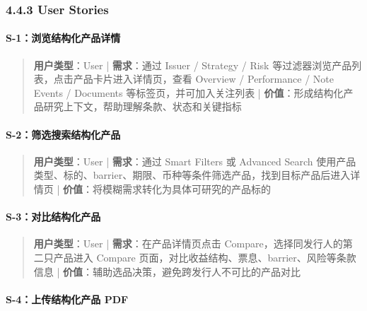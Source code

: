 \subsubsection{4.4.3 User Stories}

\paragraph{S-1：浏览结构化产品详情}

\begin{quote}\small \textbf{用户类型}：User | \textbf{需求}：通过 Issuer / Strategy / Risk 等过滤器浏览产品列表，点击产品卡片进入详情页，查看 Overview / Performance / Note Events / Documents 等标签页，并可加入关注列表 | \textbf{价值}：形成结构化产品研究上下文，帮助理解条款、状态和关键指标\end{quote}


\paragraph{S-2：筛选搜索结构化产品}

\begin{quote}\small \textbf{用户类型}：User | \textbf{需求}：通过 Smart Filters 或 Advanced Search 使用产品类型、标的、barrier、期限、币种等条件筛选产品，找到目标产品后进入详情页 | \textbf{价值}：将模糊需求转化为具体可研究的产品标的\end{quote}


\paragraph{S-3：对比结构化产品}

\begin{quote}\small \textbf{用户类型}：User | \textbf{需求}：在产品详情页点击 Compare，选择同发行人的第二只产品进入 Compare 页面，对比收益结构、票息、barrier、风险等条款信息 | \textbf{价值}：辅助选品决策，避免跨发行人不可比的产品对比\end{quote}


\paragraph{S-4：上传结构化产品 PDF}

